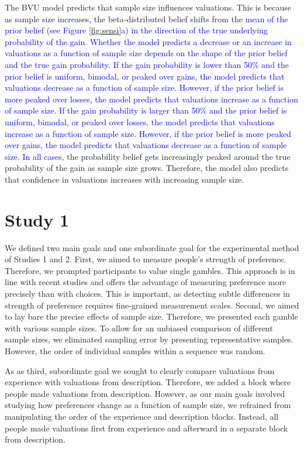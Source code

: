\documentclass[a4paper, man, natbib, floatsintext]{apa6} %
\begin{document}
The BVU model predicts that sample size influences valuations. This is because as sample size increases, the beta-distributed belief shifts from the \textcolor{blue}{mean of the prior belief (see Figure \ref{fig:sensi}a) in the direction of the true underlying probability of the gain. Whether the model predicts a decrease or an increase in valuations as a function of sample size depends on the shape of the prior belief and the true gain probability. If the gain probability is lower than 50\% and the prior belief is uniform, bimodal, or peaked over gains, the model predicts that valuations decrease as a function of sample size. However, if the prior belief is more peaked over losses, the model predicts that valuations increase as a function of sample size. If the gain probability is larger than 50\% and the prior belief is uniform, bimodal, or peaked over losses, the model predicts that valuations increase as a function of sample size. However, if the prior belief is more peaked over gains, the model predicts that valuations decrease as a function of sample size. In all cases}, the probability belief gets increasingly peaked around the true probability of the gain as sample size grows. Therefore, the model also predicts that confidence in valuations increases with increasing sample size. %

\section{Study 1}
We defined two main goals and one subordinate goal for the experimental method of Studies 1 and 2. First, we aimed to measure people's strength of preference. Therefore, we prompted participants to value single gambles. This approach is in line with recent studies \citep[e.g.,][]{Ashby2014, Golan2014, Pachur2012} and offers the advantage of measuring preference more precisely than with choices. This is important, as detecting subtle differences in strength of preference requires fine-grained measurement scales. Second, we aimed to lay bare the precise effects of sample size. Therefore, we presented each gamble with various sample sizes. To allow for an unbiased comparison of different sample sizes, we eliminated sampling error by presenting representative samples. However, the order of individual samples within a sequence was random.

As as third, subordinate goal we sought to clearly compare valuations from experience with valuations from description. Therefore, we added a block where people made valuations from description. However, as our main goals involved studying how preferences change as a function of sample size, we refrained from manipulating the order of the experience and description blocks. Instead, all people made valuations first from experience and afterward in a separate block from description. 
\end{document}
